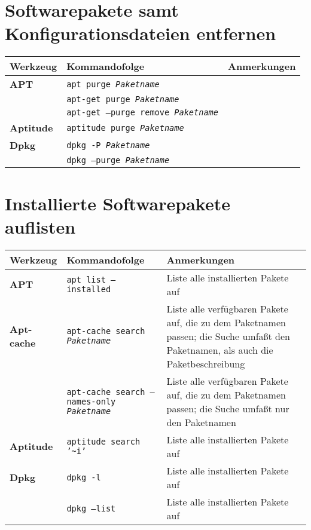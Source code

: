 \documentclass[10pt,a4paper]{article}
\begin{document}
\section{Softwarepakete samt Konfigurationsdateien entfernen}
\begin{tabular}{ p{3.5cm} p{9.6cm} p{11cm}}
  \hline
  \rowcolor{Gray}
  \textbf{Werkzeug} & \textbf{Kommandofolge} & \textbf{Anmerkungen} \\
  \hline 
  \textbf{APT}& \texttt{apt purge \textit{Paketname}} & \\
  \rowcolor{Gray}
  & \texttt{apt-get purge \textit{Paketname}} & \\
  & \texttt{apt-get --purge remove \textit{Paketname}} & \\
  \rowcolor{Gray}
  \textbf{Aptitude} & \texttt{aptitude purge \textit{Paketname}} & \\
  \textbf{Dpkg} & \texttt{dpkg -P \textit{Paketname}} & \\
  \rowcolor{Gray}
  & \texttt{dpkg --purge \textit{Paketname}} & \\
  \hline
\end{tabular}

\section{Installierte Softwarepakete auflisten}
\begin{tabular}{ p{3.5cm} p{9.6cm} p{11cm}}
  \hline
  \rowcolor{Gray}
  \textbf{Werkzeug} & \textbf{Kommandofolge} & \textbf{Anmerkungen} \\
  \hline 
  \textbf{APT}& \texttt{apt list --installed} & Liste alle installierten Pakete auf\\
  \rowcolor{Gray}
  \textbf{Apt-cache} & \texttt{apt-cache search \textit{Paketname}} & Liste alle verfügbaren Pakete auf, die zu dem Paketnamen passen; die Suche umfaßt den Paketnamen, als auch die Paketbeschreibung \\
  & \texttt{apt-cache search --names-only \textit{Paketname}} & Liste alle verfügbaren Pakete auf, die zu dem Paketnamen passen; die Suche umfaßt nur den Paketnamen \\
  \rowcolor{Gray}
  \textbf{Aptitude} & \texttt{aptitude search '\textasciitilde{}i'} & Liste alle installierten Pakete auf \\
  \textbf{Dpkg} & \texttt{dpkg -l} & Liste alle installierten Pakete auf \\
  \rowcolor{Gray}
  & \texttt{dpkg --list} & Liste alle installierten Pakete auf \\
  \hline
\end{tabular}
\end{document}
